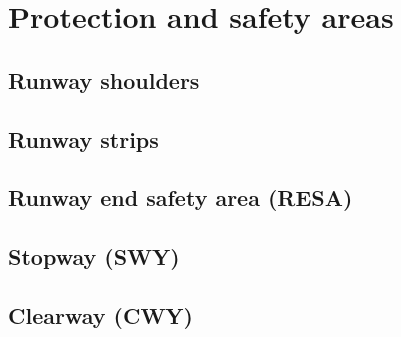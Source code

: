 	\section{Protection and safety areas}
		\subsection{Runway shoulders}
		\subsection{Runway strips}
		\subsection{Runway end safety area (RESA)}
		\subsection{Stopway (SWY)}
		\subsection{Clearway (CWY)}
		